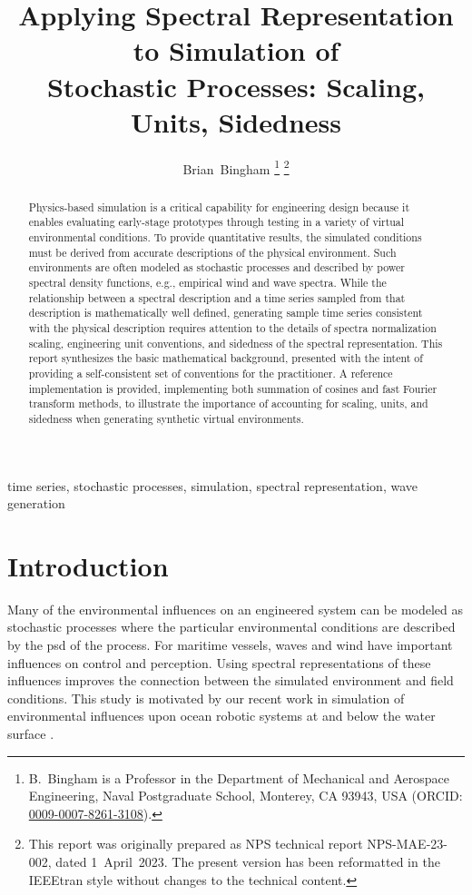 \documentclass[journal]{IEEEtran}
\title{Applying Spectral Representation to Simulation of\\Stochastic Processes: Scaling, Units, Sidedness}
\author{%
  Brian~Bingham%
  \thanks{B.~Bingham is a Professor in the Department of Mechanical and Aerospace Engineering, Naval Postgraduate School, Monterey, CA 93943, USA (ORCID: \href{https://orcid.org/0009-0007-8261-3108}{0009-0007-8261-3108}).}%
  \thanks{This report was originally prepared as NPS technical report NPS-MAE-23-002, dated 1~April~2023. The present version has been reformatted in the IEEEtran style without changes to the technical content.}%
}
\begin{document}
\maketitle

\begin{abstract}
Physics-based simulation is a critical capability for engineering design because it enables evaluating early-stage prototypes through testing in a variety of virtual environmental conditions. To provide quantitative results, the simulated conditions must be derived from accurate descriptions of the physical environment. Such environments are often modeled as stochastic processes and described by power spectral density functions, e.g., empirical wind and wave spectra. While the relationship between a spectral description and a time series sampled from that description is mathematically well defined, generating sample time series consistent with the physical description requires attention to the details of spectra normalization scaling, engineering unit conventions, and sidedness of the spectral representation. This report synthesizes the basic mathematical background, presented with the intent of providing a self-consistent set of conventions for the practitioner. A reference implementation is provided, implementing both summation of cosines and fast Fourier transform methods, to illustrate the importance of accounting for scaling, units, and sidedness when generating synthetic virtual environments.
\end{abstract}

\begin{IEEEkeywords}
time series, stochastic processes, simulation, spectral representation, wave generation
\end{IEEEkeywords}

\section{Introduction}



Many of the environmental influences on an engineered system can be modeled as stochastic processes where the particular environmental conditions are described by the \ac{psd} of the process.  For maritime vessels, waves and wind have important influences on control and perception.  Using spectral representations of these influences improves the connection between the simulated environment and field conditions.  This study is motivated by our recent work in simulation of environmental influences upon ocean robotic systems at and below the water surface \cite{bingham2019maritime, zhang22dave, choi22fasterrohtua}.
\end{document}
